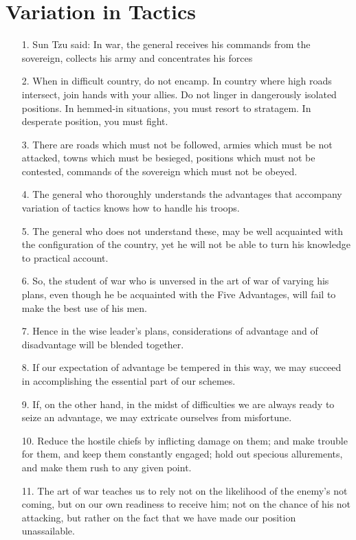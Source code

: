 \documentclass[11pt,openany]{memoir}
\newcommand{\enumeratemargin}{1.30em}
\begin{document}
\chapter{Variation in Tactics}
\begin{enumerate}[leftmargin=\enumeratemargin]
\item[1.] Sun Tzu said: In war, the general receives his commands from the sovereign, collects his army and concentrates his forces
\item[2.] When in difficult country, do not encamp. In country where high roads intersect, join hands with your allies. Do not linger in dangerously isolated positions. In hemmed-in situations, you must resort to stratagem. In desperate position, you must fight.
\item[3.] There are roads which must not be followed, armies which must be not attacked, towns which must be besieged, positions which must not be contested, commands of the sovereign which must not be obeyed.
\item[4.] The general who thoroughly understands the advantages that accompany variation of tactics knows how to handle his troops.
\item[5.] The general who does not understand these, may be well acquainted with the configuration of the country, yet he will not be able to turn his knowledge to practical account.
\item[6.] So, the student of war who is unversed in the art of war of varying his plans, even though he be acquainted with the Five Advantages, will fail to make the best use of his men.
\item[7.] Hence in the wise leader's plans, considerations of advantage and of disadvantage will be blended together.
\item[8.] If our expectation of advantage be tempered in this way, we may succeed in accomplishing the essential part of our schemes.
\item[9.] If, on the other hand, in the midst of difficulties we are always ready to seize an advantage, we may extricate ourselves from misfortune.
\item[10.] Reduce the hostile chiefs by inflicting damage on them; and make trouble for them, and keep them constantly engaged; hold out specious allurements, and make them rush to any given point.
\item[11.] The art of war teaches us to rely not on the likelihood of the enemy's not coming, but on our own readiness to receive him; not on the chance of his not attacking, but rather on the fact that we have made our position unassailable.

\end{enumerate}
\end{document}
